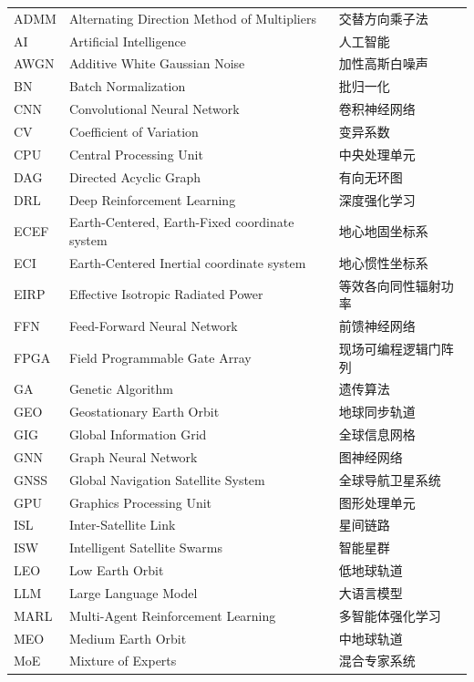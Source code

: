 {\begin{longtable}{p{} p{} p{}}
    ADMM & Alternating Direction Method of Multipliers & 交替方向乘子法 \\ 
    AI & Artificial Intelligence & 人工智能 \\ 
    AWGN & Additive White Gaussian Noise & 加性高斯白噪声 \\ 
    BN & Batch Normalization & 批归一化 \\ 
    CNN & Convolutional Neural Network & 卷积神经网络 \\ 
    CV  & Coefficient of Variation & 变异系数 \\ 
    CPU & Central Processing Unit & 中央处理单元 \\ 
    DAG & Directed Acyclic Graph & 有向无环图 \\ 
    DRL & Deep Reinforcement Learning & 深度强化学习 \\ 
    ECEF & Earth-Centered, Earth-Fixed coordinate system & 地心地固坐标系 \\ 
    ECI & Earth-Centered Inertial coordinate system & 地心惯性坐标系 \\ 
    EIRP & Effective Isotropic Radiated Power & 等效各向同性辐射功率 \\ 
    FFN & Feed-Forward Neural Network & 前馈神经网络 \\ 
    FPGA & Field Programmable Gate Array & 现场可编程逻辑门阵列 \\ 
    GA & Genetic Algorithm & 遗传算法 \\ 
    GEO & Geostationary Earth Orbit & 地球同步轨道 \\ 
    GIG & Global Information Grid & 全球信息网格 \\ 
    GNN & Graph Neural Network & 图神经网络 \\ 
    GNSS & Global Navigation Satellite System & 全球导航卫星系统 \\ 
    GPU & Graphics Processing Unit & 图形处理单元 \\ 
    ISL & Inter-Satellite Link & 星间链路 \\ 
    ISW & Intelligent Satellite Swarms & 智能星群 \\ 
    LEO & Low Earth Orbit & 低地球轨道 \\ 
    LLM & Large Language Model & 大语言模型 \\ 
    MARL & Multi-Agent Reinforcement Learning & 多智能体强化学习 \\ 
    MEO & Medium Earth Orbit & 中地球轨道 \\ 
    MoE & Mixture of Experts & 混合专家系统 \\ 

\end{longtable}}

